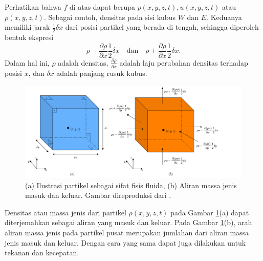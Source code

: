 \begin{spacing}{1.5}
	Perhatikan bahwa $f$ di atas dapat berupa $p(x,y,z,t), u(x,y,z,t)$ atau $\rho(x,y,z,t)$. Sebagai contoh, densitas pada sisi kubus $W$ dan $E$. Keduanya memiliki jarak $\frac{1}{2}\delta x$ dari posisi partikel yang berada di tengah, sehingga diperoleh bentuk ekspresi
	\begin{equation*}
		\rho-\frac{\partial \rho}{\partial x}\frac{1}{2}\delta x \quad \text{dan} \quad
		\rho+\frac{\partial \rho}{\partial x}\frac{1}{2}\delta x.
	\end{equation*}
	Dalam hal ini, $\rho$ adalah densitas, $\frac{\partial \rho}{\partial x}$ adalah laju perubahan densitas terhadap posisi $x$, dan $\delta x$ adalah panjang rusuk kubus.
	\begin{figure}[H]
		\centering
		\includegraphics[width=16cm]{contents/cube}
		\caption{(a) Ilustrasi partikel sebagai sifat fisis fluida, (b) Aliran massa jenis masuk dan keluar. Gambar direproduksi dari \protect{}.}
		\label{fig:cube}
	\end{figure}
	Densitas atau massa jenis dari partikel $\rho(x,y,z,t)$ pada Gambar \ref{fig:cube}(a) dapat diterjemahkan sebagai aliran yang masuk dan keluar. Pada Gambar \ref{fig:cube}(b), arah aliran massa jenis pada partikel pusat merupakan jumlahan dari aliran massa jenis masuk dan keluar. Dengan cara yang sama dapat juga dilakukan untuk tekanan dan kecepatan. 
\end{spacing}
\vspace{-1pc}

